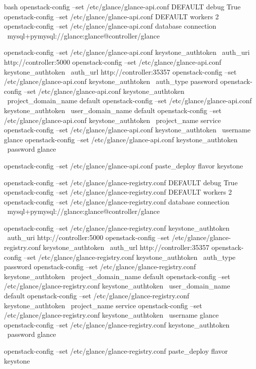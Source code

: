 \begin{code-block}{bash}
openstack-config --set /etc/glance/glance-api.conf DEFAULT debug True
openstack-config --set /etc/glance/glance-api.conf DEFAULT workers 2
openstack-config --set /etc/glance/glance-api.conf database connection \
    mysql+pymysql://glance:glance@controller/glance

openstack-config --set /etc/glance/glance-api.conf keystone_authtoken \
    auth_uri http://controller:5000
openstack-config --set /etc/glance/glance-api.conf keystone_authtoken \
    auth_url http://controller:35357
openstack-config --set /etc/glance/glance-api.conf keystone_authtoken \
    auth_type password
openstack-config --set /etc/glance/glance-api.conf keystone_authtoken \
    project_domain_name default
openstack-config --set /etc/glance/glance-api.conf keystone_authtoken \
    user_domain_name default
openstack-config --set /etc/glance/glance-api.conf keystone_authtoken \
    project_name service
openstack-config --set /etc/glance/glance-api.conf keystone_authtoken \
    username glance
openstack-config --set /etc/glance/glance-api.conf keystone_authtoken \
    password glance

openstack-config --set /etc/glance/glance-api.conf paste_deploy flavor keystone

openstack-config --set /etc/glance/glance-registry.conf DEFAULT debug True
openstack-config --set /etc/glance/glance-registry.conf DEFAULT workers 2
openstack-config --set /etc/glance/glance-registry.conf database connection \
    mysql+pymysql://glance:glance@controller/glance

openstack-config --set /etc/glance/glance-registry.conf keystone_authtoken \
    auth_uri http://controller:5000
openstack-config --set /etc/glance/glance-registry.conf keystone_authtoken \
    auth_url http://controller:35357
openstack-config --set /etc/glance/glance-registry.conf keystone_authtoken \
    auth_type password
openstack-config --set /etc/glance/glance-registry.conf keystone_authtoken \
    project_domain_name default
openstack-config --set /etc/glance/glance-registry.conf keystone_authtoken \
    user_domain_name default
openstack-config --set /etc/glance/glance-registry.conf keystone_authtoken \
    project_name service
openstack-config --set /etc/glance/glance-registry.conf keystone_authtoken \
    username glance
openstack-config --set /etc/glance/glance-registry.conf keystone_authtoken \
    password glance

openstack-config --set /etc/glance/glance-registry.conf paste_deploy flavor keystone
\end{code-block}

